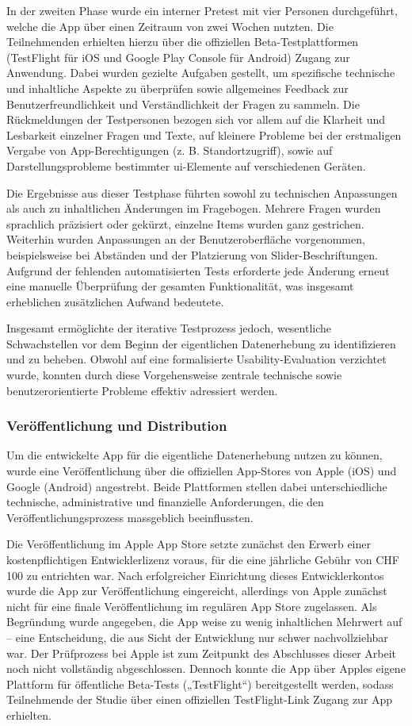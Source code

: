 In der zweiten Phase wurde ein interner Pretest mit vier Personen durchgeführt, welche die App über einen Zeitraum von zwei Wochen nutzten. Die Teilnehmenden erhielten hierzu über die offiziellen Beta-Testplattformen (TestFlight für iOS und Google Play Console für Android) Zugang zur Anwendung. Dabei wurden gezielte Aufgaben gestellt, um spezifische technische und inhaltliche Aspekte zu überprüfen sowie allgemeines Feedback zur Benutzerfreundlichkeit und Verständlichkeit der Fragen zu sammeln. Die Rückmeldungen der Testpersonen bezogen sich vor allem auf die Klarheit und Lesbarkeit einzelner Fragen und Texte, auf kleinere Probleme bei der erstmaligen Vergabe von App-Berechtigungen (z. B. Standortzugriff), sowie auf Darstellungsprobleme bestimmter \gls{ui}-Elemente auf verschiedenen Geräten.

Die Ergebnisse aus dieser Testphase führten sowohl zu technischen Anpassungen als auch zu inhaltlichen Änderungen im Fragebogen. Mehrere Fragen wurden sprachlich präzisiert oder gekürzt, einzelne Items wurden ganz gestrichen. Weiterhin wurden Anpassungen an der Benutzeroberfläche vorgenommen, beispielsweise bei Abständen und der Platzierung von Slider-Beschriftungen. Aufgrund der fehlenden automatisierten Tests erforderte jede Änderung erneut eine manuelle Überprüfung der gesamten Funktionalität, was insgesamt erheblichen zusätzlichen Aufwand bedeutete.

Insgesamt ermöglichte der iterative Testprozess jedoch, wesentliche Schwachstellen vor dem Beginn der eigentlichen Datenerhebung zu identifizieren und zu beheben. Obwohl auf eine formalisierte Usability-Evaluation verzichtet wurde, konnten durch diese Vorgehensweise zentrale technische sowie benutzerorientierte Probleme effektiv adressiert werden.

\subsubsection{Veröffentlichung und Distribution}

Um die entwickelte App für die eigentliche Datenerhebung nutzen zu können, wurde eine Veröffentlichung über die offiziellen App-Stores von Apple (iOS) und Google (Android) angestrebt. Beide Plattformen stellen dabei unterschiedliche technische, administrative und finanzielle Anforderungen, die den Veröffentlichungsprozess massgeblich beeinflussten.

Die Veröffentlichung im Apple App Store setzte zunächst den Erwerb einer kostenpflichtigen Entwicklerlizenz voraus, für die eine jährliche Gebühr von CHF 100 zu entrichten war. Nach erfolgreicher Einrichtung dieses Entwicklerkontos wurde die App zur Veröffentlichung eingereicht, allerdings von Apple zunächst nicht für eine finale Veröffentlichung im regulären App Store zugelassen. Als Begründung wurde angegeben, die App weise zu wenig inhaltlichen Mehrwert auf – eine Entscheidung, die aus Sicht der Entwicklung nur schwer nachvollziehbar war. Der Prüfprozess bei Apple ist zum Zeitpunkt des Abschlusses dieser Arbeit noch nicht vollständig abgeschlossen. Dennoch konnte die App über Apples eigene Plattform für öffentliche Beta-Tests („TestFlight“) bereitgestellt werden, sodass Teilnehmende der Studie über einen offiziellen TestFlight-Link Zugang zur App erhielten.

